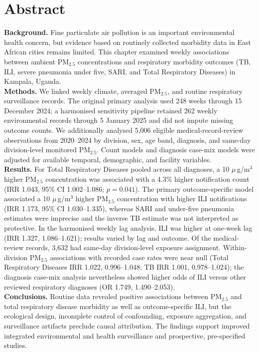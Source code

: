 \documentclass[12pt,a4paper]{report}
\newcommand{\pmfive}{PM$_{2.5}$}
\newcommand{\ugm}{\ensuremath{\mu}\,g/m$^3$}
\begin{document}
\chapter*{Abstract}
\noindent\textbf{Background.} Fine particulate air pollution is an important environmental health concern, but evidence based on routinely collected morbidity data in East African cities remains limited. This chapter examined weekly associations between ambient \pmfive{} concentrations and respiratory morbidity outcomes (TB, ILI, severe pneumonia under five, SARI, and Total Respiratory Diseases) in Kampala, Uganda.\\
\noindent\textbf{Methods.} We linked weekly climate, averaged \pmfive{}, and routine respiratory surveillance records. The original primary analysis used 248 weeks through 15 December 2024; a harmonised sensitivity pipeline retained 262 weekly environmental records through 5 January 2025 and did not impute missing outcome counts. We additionally analysed 5,006 eligible medical-record-review observations from 2020--2024 by division, sex, age band, diagnosis, and same-day division-level monitored \pmfive{}. Count models and diagnosis case-mix models were adjusted for available temporal, demographic, and facility variables.\\
\noindent\textbf{Results.} For Total Respiratory Diseases pooled across all diagnoses, a 10 \ugm{} higher \pmfive{} concentration was associated with a 4.3\% higher notification count (IRR 1.043, 95\% CI 1.002--1.086; $p=0.041$). The primary outcome-specific model associated a 10 \ugm{} higher \pmfive{} concentration with higher ILI notifications (IRR 1.173, 95\% CI 1.030--1.335), whereas SARI and under-five pneumonia estimates were imprecise and the inverse TB estimate was not interpreted as protective. In the harmonised weekly lag analysis, ILI was higher at one-week lag (IRR 1.327, 1.086--1.621); results varied by lag and outcome. Of the medical-review records, 3,632 had same-day division-level exposure assignment. Within-division \pmfive{} associations with recorded case rates were near null (Total Respiratory Diseases IRR 1.022, 0.996--1.048; TB IRR 1.001, 0.978--1.024); the diagnosis case-mix analysis nevertheless showed higher odds of ILI versus other reviewed respiratory diagnoses (OR 1.749, 1.490--2.053).\\
\noindent\textbf{Conclusions.} Routine data revealed positive associations between \pmfive{} and total respiratory disease morbidity as well as outcome-specific ILI, but the ecological design, incomplete control of confounding, exposure aggregation, and surveillance artifacts preclude causal attribution. The findings support improved integrated environmental and health surveillance and prospective, pre-specified studies.
\end{document}
